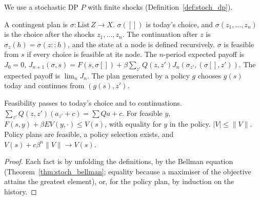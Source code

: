 We use a stochastic DP $P$ with finite shocks (Definition~\ref{def:stoch_dp}).

\begin{definition}
\label{def:stoch_plan}
\leanok
{}
A contingent plan is $\sigma : \mathrm{List}\,Z \to X$. $\sigma([])$ is today's choice, and $\sigma(z_1,\dots,z_n)$ is
the choice after the shocks $z_1, \dots, z_n$. The continuation after $z$ is $\sigma_z(h) = \sigma(z :: h)$, and
the state at a node is defined recursively. $\sigma$ is feasible from $s$ if every choice is feasible at its node.
The $n$-period expected payoff is
$J_0 = 0$, $J_{n+1}(\sigma, s) = F(s, \sigma[]) + \beta \sum_{z'} Q(z,z') J_n(\sigma_{z'}, (\sigma[], z'))$.
The expected payoff is $\lim_n J_n$. The plan generated by a policy $g$ chooses $g(s)$ today and continues
from $(g(s), z')$.
\end{definition}

\begin{lemma}
\label{lem:stoch_plan_basic}
\leanok
{}
Feasibility passes to today's choice and to continuations. $\sum_{z'} Q(z,z')(a_{z'} + c) = \sum Q a + c$.
For feasible $y$, $F(s,y) + \beta E V(y,\cdot) \le V(s)$, with equality for $y$ in the policy. $|V| \le \|V\|$. Policy
plans are feasible, a policy selection exists, and $V(s) + c\beta^n\|V\| \to V(s)$.
\end{lemma}
\begin{proof}
\leanok
Each fact is by unfolding the definitions, by the Bellman equation (Theorem~\ref{thm:stoch_bellman}; equality
because a maximiser of the objective attains the greatest element), or, for the policy plan, by induction on
the history.
\end{proof}

